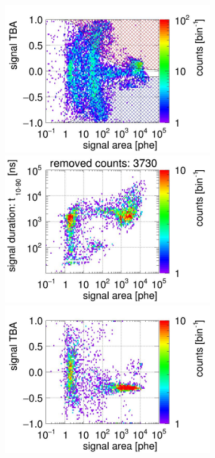 \begin{landscape}
\begin{figure}[!p]
\begin{subfigure}[t]{0.32\textwidth}
			\includegraphics[width=\figurewidth,clip,trim={0 98 0 40}]{Figures/GasTest/CutsValid/res64850/tbapa26Vecfig64850.jpg}
			\includegraphics[width=\figurewidth,clip,trim={0 98 0 15}]{Figures/GasTest/CutsValid/res64850/pdpaX26Vecfig64850.jpg}
			\includegraphics[width=\figurewidth,clip,trim={0 8 0 40}]{Figures/GasTest/CutsValid/res64850/tbapaX26Vecfig64850.jpg}

\end{subfigure}
\end{figure}
\end{landscape}
